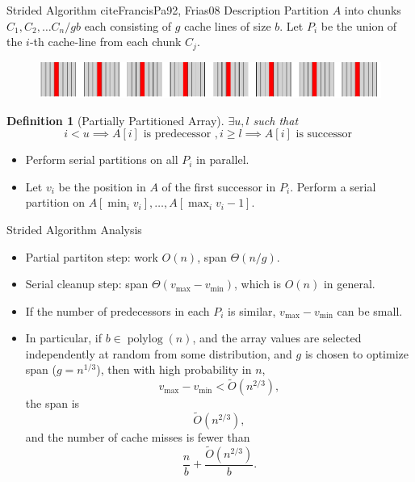 \documentclass[x11names, svgnames, rgb]{beamer}
\newcommand{\polylog}{\operatorname{polylog}}
\newtheorem{defin}{Definition}
\begin{document}
\begin{frame}[t]{Strided Algorithm cite{FrancisPa92, Frias08} Description}
	Partition $A$ into chunks $C_1,C_2,\ldots C_n/gb$ each consisting of $g$ cache lines of size $b$. Let $P_i$ be the union of the $i$-th cache-line from each chunk $C_j$.
	\begin{figure}
		\includegraphics[width=\linewidth]{imgs/stridedAlgHighlighted.png}
	\end{figure}
	\begin{defin}[Partially Partitioned Array]
		$\exists u, l $ such that $$i < u \implies A[i] \text{ is predecessor }, i \ge l \implies A[i] \text{ is successor }$$
	\end{defin}
	\begin{itemize}
		\item Perform serial partitions on all $P_i$ in parallel.
		\item Let $v_i$ be the position in $A$ of the first successor in $P_i$. Perform a serial partition on $A[\min_i v_i], \ldots, A[\max_i v_i -1]$.
	\end{itemize}
\end{frame}

\begin{frame}[t]{Strided Algorithm Analysis}
	\begin{itemize}
		\item Partial partiton step: work $O(n)$, span $\Theta(n/g)$.
		\item Serial cleanup step: span $\Theta(v_\text{max}-v_\text{min})$, which is $O(n)$ in general.
		\item If the number of predecessors in each $P_i$ is similar, $v_\text{max}-v_\text{min}$ can be small.
		\item In particular, if $b\in \polylog(n)$, and the array values are selected independently at random from some distribution, and $g$ is chosen to optimize span ($g=n^{1/3}$), then with high probability in $n$, $$v_\text{max}-v_\text{min} < \tilde{O}(n^{2/3}),$$ the span is $$\tilde{O}(n^{2/3}),$$ and the number of cache misses is fewer than $$\frac{n}{b}+\frac{\tilde{O}(n^{2/3})}{b}.$$
	\end{itemize}
\end{frame}
\end{document}
